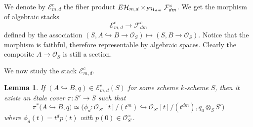 \documentclass{alggeom}
\numberwithin{equation}{section}
\numberwithin{subsection}{section}
\newtheorem{lemma}[theorem]{Lemma}
\theoremstyle{definition}
\theoremstyle{remark}
\newcommand\cE{\mathcal{E}} \newcommand\cF{\mathcal{F}}
\newcommand\cO{\mathcal{O}} \newcommand\cP{\mathcal{P}}
\newcommand\into{\hookrightarrow}
\begin{document}
We denote by $\cE_{m,d}^c$ the fiber product $E\cH_{m,d}\times_{F\cH_{dm}}\cF_{dm}^c$. We get the morphism of algebraic stacks
$$ \cE_{m,d}^c \longrightarrow \cF_{dm}^c$$ 
defined by the association $(S,A\into B \rightarrow \cO_S) \mapsto (S,B\rightarrow \cO_S)$. Notice that the morphism is faithful, therefore representable by algebraic spaces.  Clearly the composite $A\rightarrow \cO_S$ is still a section. 

We now study the stack $\cE_{m,d}^c$.

\begin{lemma}\label{lem:triv-ext}
	If $(A\into B,q) \in \cE_{m,d}^c(S)$ for some scheme $k$-scheme $S$, then it exists an \'etale cover $\pi:S'\rightarrow S$ such that 
	$$\pi^*\Big(A\into B,q\Big) \simeq \Big(\phi_d:\cO_{S'}[t]/(t^{m})\into \cO_{S'}[t]/(t^{dm}),q_0\otimes_{S}S'\Big)$$
	where $\phi_d(t)=t^dp(t)$ with $p(0) \in \cO_{S'}^{\times}$.
\end{lemma}
\end{document}
